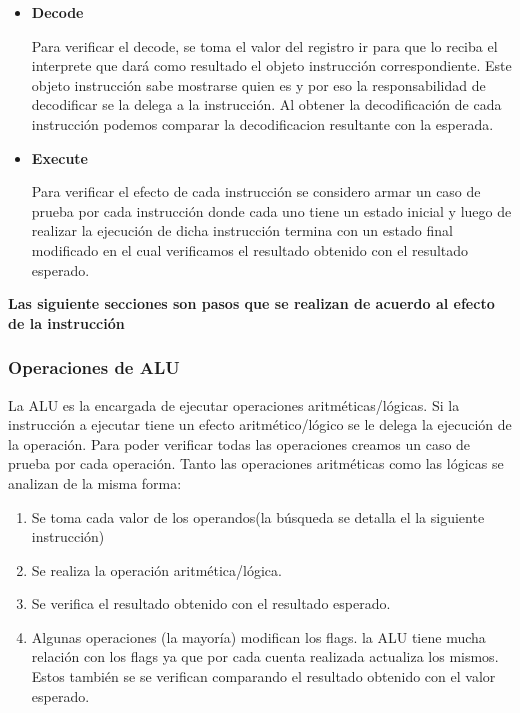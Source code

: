 \begin{enumerate}
\begin{itemize}
\item \textbf{Decode}

Para verificar el decode, se toma el valor del registro ir para que lo reciba el interprete que dará como resultado el objeto instrucción correspondiente. Este objeto instrucción sabe mostrarse quien es y por eso la responsabilidad de decodificar se la delega a la instrucción. Al obtener la decodificación de cada instrucción podemos comparar la decodificacion resultante con la esperada.
 
\item \textbf{Execute}

Para verificar el efecto de cada instrucción se considero armar un caso de prueba por cada instrucción donde cada uno tiene un estado inicial y luego de realizar la ejecución de dicha instrucción termina con un estado final modificado en el cual verificamos el resultado obtenido con el resultado esperado. 
\end{itemize}

\textbf{Las siguiente secciones son pasos que se realizan de acuerdo al efecto de la instrucción}
  
\subsubsection{Operaciones de ALU}

La ALU es la encargada de ejecutar operaciones aritméticas/lógicas. Si la instrucción a ejecutar tiene un efecto aritmético/lógico se le delega la ejecución de la operación. Para poder verificar todas las operaciones creamos un caso de prueba por cada operación. Tanto las operaciones aritméticas como las lógicas se analizan de la misma forma:

\begin{enumerate}
\item Se toma cada valor de los operandos(la búsqueda se detalla el la siguiente instrucción)

\item Se realiza la operación aritmética/lógica. 

\item Se verifica el resultado obtenido con el resultado esperado.

\item Algunas operaciones (la mayoría) modifican los flags. la ALU tiene mucha relación con los flags ya que por cada cuenta realizada actualiza los mismos. Estos también se se verifican comparando el resultado obtenido con el valor esperado. 
\end{enumerate}


\end{enumerate}
